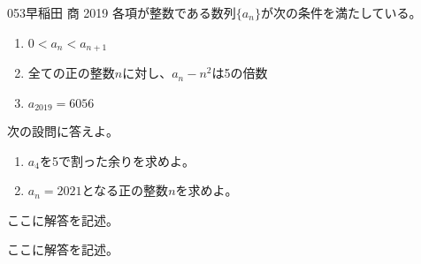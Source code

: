 \begin{thm}{053}{}{早稲田 商 2019}
 各項が整数である数列$\{a_n\}$が次の条件を満たしている。
 \begin{enumerate}[label=\roman*,align=CenterWithParen]
  \item $0<a_n<a_{n+1}$
  \item 全ての正の整数$n$に対し、$a_n-n^2$は5の倍数
  \item $a_{2019}=6056$
 \end{enumerate}
 次の設問に答えよ。
 \begin{enumerate}
  \item $a_4$を5で割った余りを求めよ。
  \item $a_n=2021$となる正の整数$n$を求めよ。
 \end{enumerate}
\end{thm}

ここに解答を記述。

ここに解答を記述。
